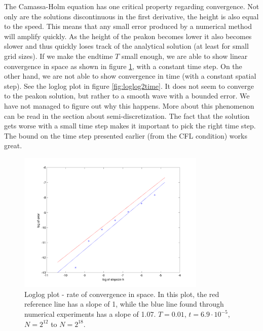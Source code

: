 The Camassa-Holm equation has one critical property regarding convergence. Not only are the solutions discontinuous in the first derivative, the height is also equal to the speed. This means that any small error produced by a numerical method will amplify quickly. As the height of the peakon becomes lower it also becomes slower and thus quickly loses track of the analytical solution (at least for small grid sizes). If we make the endtime $T$ small enough, we are able to show linear convergence in space as shown in figure \ref{fig:loglog2}, with a constant time step. On the other hand, we are not able to show convergence in time (with a constant spatial step). See the loglog plot in figure \ref{fig:loglog2time}. It does not seem to converge to the peakon solution, but rather to a smooth wave with a bounded error. We have not managed to figure out why this happens. More about this phenomenon can be read in the section about semi-discretization. The fact that the solution gets worse with a small time step makes it important to pick the right time step. The bound on the time step presented earlier (from the CFL condition) works great. 
 

\begin{figure}[h]
        \centering
        \includegraphics[width=0.8\textwidth]{gfx/loglog2}
        \caption{Loglog plot - rate of convergence in space. In this plot, the red reference line has a slope of 1, while the blue line found through numerical experiments has a slope of 1.07. $T = 0.01$, $t = 6.9 \cdot 10^{-5}$,$N = 2^{12}$ to $N = 2^{18}$.}
        \label{fig:loglog2}
\end{figure}

